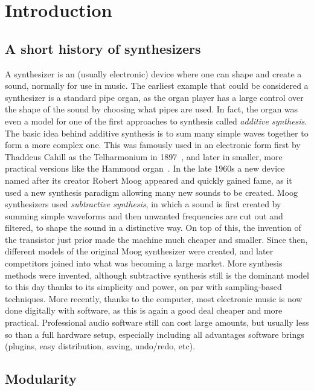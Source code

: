 \documentclass[11pt,a4paper]{article}
\begin{document}
\section{Introduction}

\subsection{A short history of synthesizers}

A synthesizer is an (usually electronic) device where one can shape and create a sound, normally for use in music. The earliest example that could be considered a synthesizer is a standard pipe organ, as the organ player has a large control over the shape of the sound by choosing what pipes are used. In fact, the organ was even a model for one of the first approaches to synthesis called \emph{additive synthesis}. The basic idea behind additive synthesis is to sum many simple waves together to form a more complex one. This was famously used in an electronic form first by Thaddeus Cahill as the Telharmonium in 1897~\cite{Telharmonium}, and later in smaller, more practical versions like the Hammond organ~\cite{Hammond}.
In the late 1960s a new device named after its creator Robert Moog appeared and quickly gained fame, as it used a new synthesis paradigm allowing many new sounds to be created. Moog synthesizers used \emph{subtractive synthesis}, in which a sound is first created by summing simple waveforms and then unwanted frequencies are cut out and filtered, to shape the sound in a distinctive way. On top of this, the invention of the transistor just prior made the machine much cheaper and smaller. Since then, different models of the original Moog synthesizer were created, and later competitors joined into what was becoming a large market. More synthesis methods were invented, although subtractive synthesis still is the dominant model to this day thanks to its simplicity and power, on par with sampling-based techniques. More recently, thanks to the computer, most electronic music is now done digitally with software, as this is again a good deal cheaper and more practical. Professional audio software still can cost large amounts, but usually less so than a full hardware setup, especially including all advantages software brings (plugins, easy distribution, saving, undo/redo, etc).

\subsection{Modularity}
\end{document}
